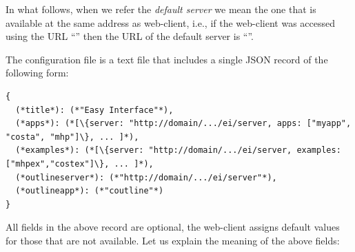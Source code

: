 In what follows, when we refer the \emph{default server} we mean the
one that is available at the same address as web-client, i.e., if the
web-client was accessed using the URL
``'' then the URL of the
default server is ``''.

The configuration file is a text file that includes a single JSON
record of the following form:

\bigskip
\begin{lstlisting}
{
  (*title*): (*"Easy Interface"*),
  (*apps*): (*[\{server: "http://domain/.../ei/server, apps: ["myapp", "costa", "mhp"]\}, ... ]*),
  (*examples*): (*[\{server: "http://domain/.../ei/server, examples: ["mhpex","costex"]\}, ... ]*),
  (*outlineserver*): (*"http://domain/.../ei/server"*),
  (*outlineapp*): (*"coutline"*)
}
\end{lstlisting}

\bigskip
\noindent
All fields in the above record are optional, the web-client assigns
default values for those that are not available. Let us explain the
meaning of the above fields:

